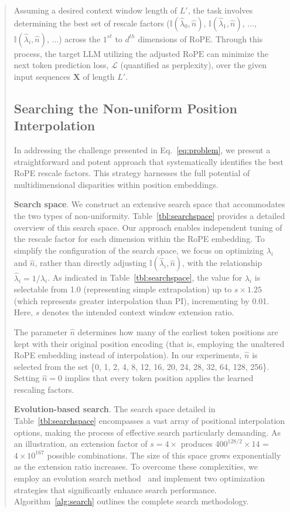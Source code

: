 \begin{abstract}
Assuming a desired context window length of $L'$, the task involves determining the best set of rescale factors ($\mathbb{I}(\hat{\lambda}_{0},\hat{n})$, $\mathbb{I}(\hat{\lambda}_{1},\hat{n})$, ..., $\mathbb{I}(\hat{\lambda}_{i},\hat{n})$, ...) across the $1^{st}$ to $d^{th}$ dimensions of RoPE. Through this process, the target $\text{LLM}$ utilizing the adjusted $\text{RoPE}$ can minimize the next token prediction loss, $\mathcal{L}$ (quantified as perplexity), over the given input sequences $\mathbf{X}$ of length $L'$.

\subsection{Searching the Non-uniform Position Interpolation}

In addressing the challenge presented in Eq.~\ref{eq:problem}, we present a straightforward and potent approach that systematically identifies the best RoPE rescale factors. This strategy harnesses the full potential of multidimensional disparities within position embeddings.

\textbf{Search space}. We construct an extensive search space that accommodates the two types of non-uniformity. Table~\ref{tbl:searchspace} provides a detailed overview of this search space. Our approach enables independent tuning of the rescale factor for each dimension within the RoPE embedding. To simplify the configuration of the search space, we focus on optimizing $\lambda_i$ and $\hat{n}$, rather than directly adjusting $\mathbb{I}(\hat{\lambda}_{i},\hat{n})$, with the relationship $\hat{\lambda}_{i}=1/\lambda_i$. As indicated in Table~\ref{tbl:searchspace}, the value for $\lambda_i$ is selectable from 1.0 (representing simple extrapolation) up to $s\times1.25$ (which represents greater interpolation than PI), incrementing by 0.01. Here, $s$ denotes the intended context window extension ratio.

The parameter $\hat{n}$ determines how many of the earliest token positions are kept with their original position encoding (that is, employing the unaltered RoPE embedding instead of interpolation). In our experiments, $\hat{n}$ is selected from the set \{0, 1, 2, 4, 8, 12, 16, 20, 24, 28, 32, 64, 128, 256\}. Setting $\hat{n}=0$ implies that every token position applies the learned rescaling factors.

\textbf{Evolution-based search}. The search space detailed in Table~\ref{tbl:searchspace} encompasses a vast array of positional interpolation options, making the process of effective search particularly demanding. As an illustration, an extension factor of $s=4\times$ produces $400^{128/2}\times14$ = $4\times10^{167}$ possible combinations. The size of this space grows exponentially as the extension ratio increases. To overcome these complexities, we employ an evolution search method~\cite{guo2020single} and implement two optimization strategies that significantly enhance search performance. Algorithm~\ref{alg:search} outlines the complete search methodology.


\end{abstract}
